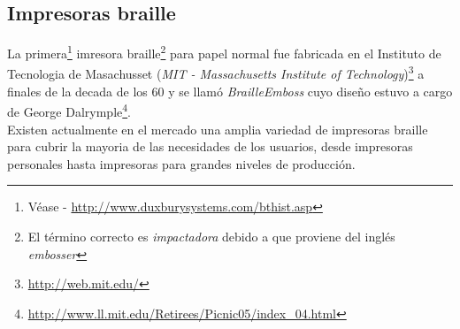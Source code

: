\subsection{Impresoras braille}
%
La primera\footnote{V\'ease - \url{http://www.duxburysystems.com/bthist.asp}}
imresora braille\footnote{El t\'ermino correcto es \emph{impactadora} debido a
que proviene del ingl\'es \emph{embosser}} para papel normal fue fabricada en
el Instituto de Tecnologia de Masachusset (\emph{MIT - Massachusetts Institute
of Technology})\footnote{\url{http://web.mit.edu/}} a finales de la decada de
los 60 y se llam\'o \emph{BrailleEmboss} cuyo dise\~no estuvo a cargo de
George Dalrymple\footnote{\url{
http://www.ll.mit.edu/Retirees/Picnic05/index_04.html}}.\\



Existen actualmente en el mercado una amplia variedad de impresoras braille
para cubrir la mayoria de las necesidades de los usuarios, desde impresoras
personales hasta impresoras para grandes niveles de producci\'on.